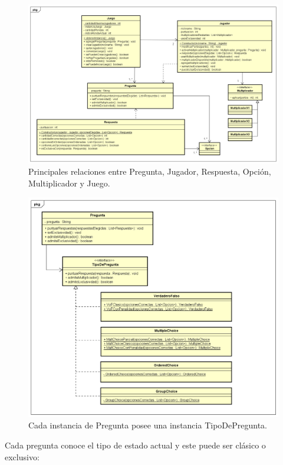 \documentclass[titlepage,a4paper]{article}
\begin{document}
\begin{figure}[H]
\centering
\includegraphics[width=1\textwidth]{img/UMLClases2.png}
\caption{\label{fig:class01}Principales relaciones entre Pregunta, Jugador, Respuesta, Opción, Multiplicador y Juego.}
\end{figure}

\begin{figure}[H]
\centering
\includegraphics[width=1\textwidth]{img/UMLClases3.png}
\caption{\label{fig:class01}Cada instancia de Pregunta posee una instancia TipoDePregunta.}
\end{figure}

\newpage
Cada pregunta conoce el tipo de estado actual y este puede ser clásico o exclusivo:
\end{document}
